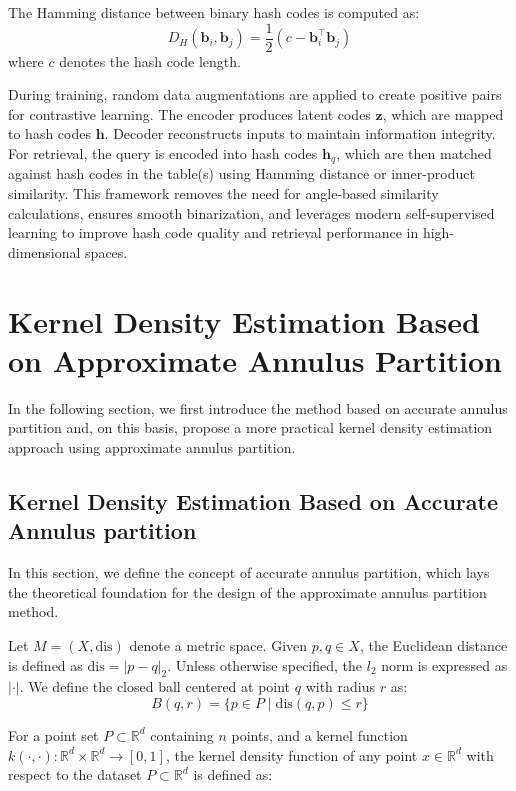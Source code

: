 \documentclass[conference]{IEEEtran}
\begin{document}
The Hamming distance between binary hash codes is computed as:
\[
D_H(\mathbf{b}_i,\mathbf{b}_j)
=
\frac{1}{2}
\left(
c-\mathbf{b}_i^\top \mathbf{b}_j
\right)
\]
where $c$ denotes the hash code length.

During training, random data augmentations are applied to create positive pairs for contrastive learning. The encoder produces latent codes $\mathbf{z}$, which are mapped to hash codes $\mathbf{h}$. Decoder reconstructs inputs to maintain information integrity. For retrieval, the query is encoded into hash codes $\mathbf{h}_q$, which are then matched against hash codes in the table(s) using Hamming distance or inner-product similarity. This framework removes the need for angle-based similarity calculations, ensures smooth binarization, and leverages modern self-supervised learning to improve hash code quality and retrieval performance in high-dimensional spaces.


\section{Kernel Density Estimation Based on Approximate Annulus Partition}
In the following section, we first introduce the method based on accurate annulus partition and, on this basis, propose a more practical kernel density estimation approach using approximate annulus partition.

\subsection{Kernel Density Estimation Based on Accurate Annulus partition}
In this section, we define the concept of accurate annulus partition, which lays the theoretical foundation for the design of the approximate annulus partition method.
 

Let $M = (X, \mathrm{dis})$ denote a metric space.
Given $p, q \in X$, the Euclidean distance is defined as ${\mathrm{dis}} = |p - q|_2$.
Unless otherwise specified, the $l_2$ norm is expressed as $|\cdot|$.
We define the closed ball centered at point $q$ with radius $r$ as:
\begin{equation*}
B(q,r) = \{ p \in P \mid \mathrm{dis}(q,p) \leq r \}
\end{equation*}


For a point set $P \subset \mathbb{R}^d$ containing $n$ points, and a kernel function $k(\cdot,\cdot): \mathbb{R}^d \times \mathbb{R}^d \to [0,1]$,
the kernel density function of any point $x \in \mathbb{R}^d$ with respect to the dataset $P \subset \mathbb{R}^d$ is defined as:
\end{document}
